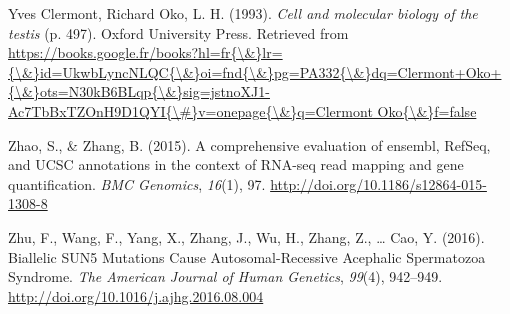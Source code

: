 \documentclass[12pt,twoside]{reedthesis}
\theoremstyle{definition}
\theoremstyle{definition}
\theoremstyle{remark}
\begin{document}
  \hypertarget{ref-YvesClermontRichardOko1993}{}
  Yves Clermont, Richard Oko, L. H. (1993). \emph{Cell and molecular
  biology of the testis} (p. 497). Oxford University Press. Retrieved from
  \href{https://books.google.fr/books?hl=fr\%7B/\&\%7Dlr=\%7B/\&\%7Did=UkwbLyncNLQC\%7B/\&\%7Doi=fnd\%7B/\&\%7Dpg=PA332\%7B/\&\%7Ddq=Clermont+Oko+\%7B/\&\%7Dots=N30kB6BLqp\%7B/\&\%7Dsig=jstnoXJ1-Ac7TbBxTZOnH9D1QYI\%7B/\#\%7Dv=onepage\%7B/\&\%7Dq=Clermont\%20Oko\%7B/\&\%7Df=false}{https://books.google.fr/books?hl=fr\{\textbackslash{}\&\}lr=\{\textbackslash{}\&\}id=UkwbLyncNLQC\{\textbackslash{}\&\}oi=fnd\{\textbackslash{}\&\}pg=PA332\{\textbackslash{}\&\}dq=Clermont+Oko+\{\textbackslash{}\&\}ots=N30kB6BLqp\{\textbackslash{}\&\}sig=jstnoXJ1-Ac7TbBxTZOnH9D1QYI\{\textbackslash{}\#\}v=onepage\{\textbackslash{}\&\}q=Clermont Oko\{\textbackslash{}\&\}f=false}
  
  \hypertarget{ref-Zhao2015}{}
  Zhao, S., \& Zhang, B. (2015). A comprehensive evaluation of ensembl,
  RefSeq, and UCSC annotations in the context of RNA-seq read mapping and
  gene quantification. \emph{BMC Genomics}, \emph{16}(1), 97.
  \url{http://doi.org/10.1186/s12864-015-1308-8}
  
  \hypertarget{ref-Zhu2016}{}
  Zhu, F., Wang, F., Yang, X., Zhang, J., Wu, H., Zhang, Z., \ldots{} Cao,
  Y. (2016). Biallelic SUN5 Mutations Cause Autosomal-Recessive Acephalic
  Spermatozoa Syndrome. \emph{The American Journal of Human Genetics},
  \emph{99}(4), 942--949. \url{http://doi.org/10.1016/j.ajhg.2016.08.004}


\end{document}
